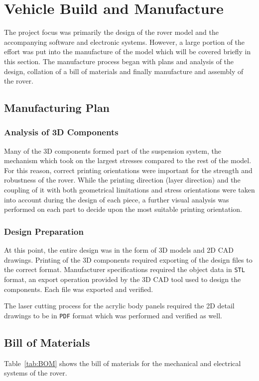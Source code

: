 \section{Vehicle Build and Manufacture}
\label{sec:vehicleBuildAndManufacture}
  The project focus was primarily the design of the rover model and the accompanying software and electronic systems. However, a large portion of the effort was put into the manufacture of the model which will be covered briefly in this section. The manufacture process began with plans and analysis of the design, collation of a bill of materials and finally manufacture and assembly of the rover.
  
  \subsection{Manufacturing Plan}
    \subsubsection{Analysis of 3D Components}
      Many of the 3D components formed part of the suspension system, the mechanism which took on the largest stresses compared to the rest of the model. For this reason, correct printing orientations were important for the strength and robustness of the rover. While the printing direction (layer direction) and the coupling of it with both geometrical limitations and stress orientations were taken into account during the design of each piece, a further visual analysis was performed on each part to decide upon the most suitable printing orientation.
      
    \subsubsection{Design Preparation}
      At this point, the entire design was in the form of 3D models and 2D CAD drawings. Printing of the 3D components required exporting of the design files to the correct format. Manufacturer specifications required the object data in \texttt{STL} format, an export operation provided by the 3D CAD tool used to design the components. Each file was exported and verified.
      
      The laser cutting process for the acrylic body panels required the 2D detail drawings to be in \texttt{PDF} format which was performed and verified as well.
    
  \subsection{Bill of Materials}
    Table~\ref{tab:BOM} shows the bill of materials for the mechanical and electrical systems of the rover.
  
